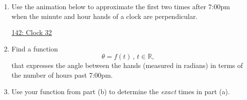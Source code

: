 \documentclass{ximera}
\begin{document}
\begin{question} \label{Qdgbhyy7777}
\begin{enumerate} 
\item Use the animation below to approximate the first two times after 7:00pm when the minute and hour hands of a clock are perpendicular.

\begin{onlineOnly}
    \begin{center}
\end{center}
\end{onlineOnly}

\href{https://www.desmos.com/calculator/rdqfuflcmq}{142: Clock 32}


\item Find a function 
\[
  \theta = f(t) \, , \, t\in \mathbb{R} ,
\]
that expresses the angle between the hands (measured in radians) in terms of the number of hours past 7:00pm.

\item Use your function from part (b) to determine the \emph{exact} times in part (a).
\end{enumerate}

\end{question}
\end{document}
